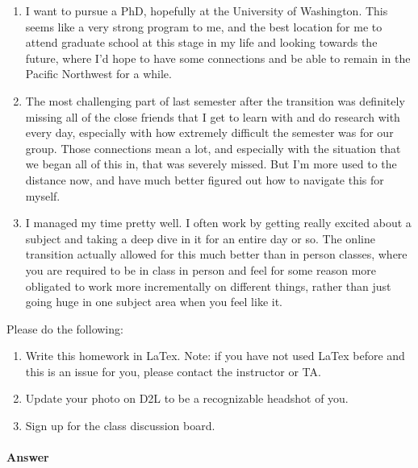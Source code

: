 \documentclass{article}
\begin{document}
\begin{enumerate}
		\item I want to pursue a PhD, hopefully at the University of Washington. This seems like
		a very strong program to me, and the best location for me to attend graduate school
		at this stage in my life and looking towards the future, where I'd hope to have some
		connections and be able to remain in the Pacific Northwest for a while.

		\item The most challenging part of last semester after the transition was definitely missing
		all of the close friends that I get to learn with and do research with every day, especially
		with how extremely difficult the semester was for our group. Those connections mean a lot,
		and especially with the situation that we began all of this in, that was severely missed.
		But I'm more used to the distance now, and have much better figured out how to navigate
		this for myself.
		
		\item I managed my time pretty well. I often work by getting really excited about a subject
		and taking a deep dive in it for an entire day or so. The online transition actually
		allowed for this much better than in person classes, where you are required to be in
		class in person and feel for some reason more obligated to work more incrementally on
		different things, rather than just going huge in one subject area when you feel like it.

	\end{enumerate}

\nextprob
{}

Please do the following:
\begin{enumerate}
    \item Write this homework in LaTex.
        Note: if you have not used LaTex before and this is an
        issue for you, please contact the instructor or TA.
    \item Update your photo on D2L to be a recognizable headshot of you.
    \item Sign up for the class discussion board.
\end{enumerate}

\paragraph{Answer}

\end{document}
